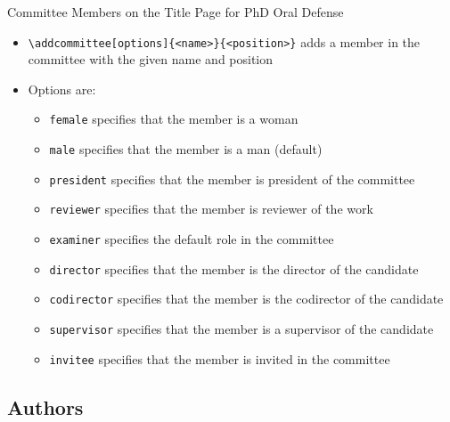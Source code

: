 \documentclass[english,sectioncirclenumberstyle]{ciadbeamer}
\begin{document}
\begin{frame}{{Committee Members} on the Title Page for PhD Oral Defense}
	\begin{itemize}
	\item \texttt{{\textbackslash}addcommittee[options]\{<name>\}\{<position>\}} adds a member in the committee with the given name and position
	\item Options are:
		\begin{itemize}
		\item \texttt{female} specifies that the member is a woman
		\item \texttt{male} specifies that the member is a man (default)
		\item \texttt{president} specifies that the member is president of the committee
		\item \texttt{reviewer} specifies that the member is reviewer of the work
		\item \texttt{examiner} specifies the default role in the committee
		\item \texttt{director} specifies that the member is the director of the candidate
		\item \texttt{codirector} specifies that the member is the codirector of the candidate
		\item \texttt{supervisor} specifies that the member is a supervisor of the candidate
		\item \texttt{invitee} specifies that the member is invited in the committee
		\end{itemize}
	\end{itemize}
\end{frame}

\subsection{Authors}
\end{document}
